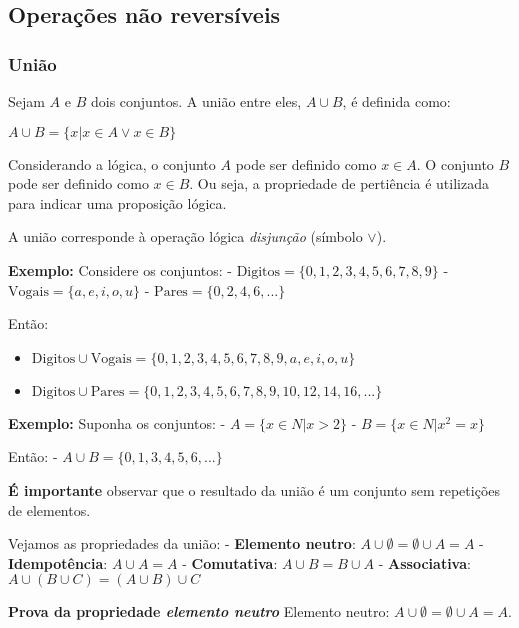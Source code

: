 \documentclass{article}
\begin{document}
    \subsection{Operações não reversíveis}



    \subsubsection{União}


    Sejam \(A\) e \(B\) dois conjuntos. A união entre eles, \(A \cup B\), é
definida como:

\(A \cup B = \{x | x \in A \lor x \in B\}\)

Considerando a lógica, o conjunto \(A\) pode ser definido como
\(x \in A\). O conjunto \(B\) pode ser definido como \(x \in B\). Ou
seja, a propriedade de pertiência é utilizada para indicar uma
proposição lógica.

A união corresponde à operação lógica \emph{disjunção} (símbolo
\(\lor\)).

\textbf{Exemplo:} Considere os conjuntos: -
\(\mbox{Digitos} = \{0, 1, 2, 3, 4, 5, 6, 7, 8, 9\}\) -
\(\mbox{Vogais} = \{a, e, i, o, u\}\) -
\(\mbox{Pares} = \{0, 2, 4, 6, ...\}\)

Então:

\begin{itemize}
\itemsep1pt\parskip0pt
\item
  \(\mbox{Digitos} \cup \mbox{Vogais} = \{0, 1, 2, 3, 4, 5, 6, 7, 8, 9, a, e, i, o, u\}\)
\item
  \(\mbox{Digitos} \cup \mbox{Pares} = \{0, 1, 2, 3, 4, 5, 6, 7, 8, 9, 10, 12, 14, 16, ...\}\)
\end{itemize}

\textbf{Exemplo:} Suponha os conjuntos: - \(A = \{x \in N | x > 2\}\) -
\(B = \{x \in N | x^2 = x\}\)

Então: - \(A \cup B = \{0, 1, 3, 4, 5, 6, ...\}\)

\textbf{É importante} observar que o resultado da união é um conjunto
sem repetições de elementos.

Vejamos as propriedades da união: - \textbf{Elemento neutro}:
\(A \cup \emptyset = \emptyset \cup A = A\) - \textbf{Idempotência}:
\(A \cup A = A\) - \textbf{Comutativa}: \(A \cup B = B \cup A\) -
\textbf{Associativa}: \(A \cup (B \cup C) = (A \cup B) \cup C\)

\textbf{Prova da propriedade \emph{elemento neutro}} Elemento neutro:
\(A \cup \emptyset = \emptyset \cup A = A\).
\end{document}
